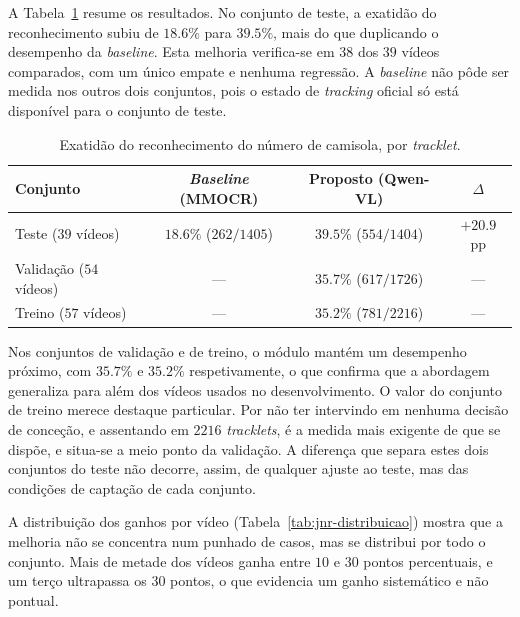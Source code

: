 A Tabela~\ref{tab:jnr-resumo} resume os resultados. No conjunto de teste, a exatidão do reconhecimento subiu de $18.6\%$ para $39.5\%$, mais do que duplicando o desempenho da \emph{baseline}. Esta melhoria verifica-se em $38$ dos $39$ vídeos comparados, com um único empate e nenhuma regressão. A \emph{baseline} não pôde ser medida nos outros dois conjuntos, pois o estado de \emph{tracking} oficial só está disponível para o conjunto de teste.

\begin{table}[htbp]
    \centering
    \caption{Exatidão do reconhecimento do número de camisola, por \emph{tracklet}.}
    \label{tab:jnr-resumo}
    \begin{tabular}{lccc}
        \hline
        \textbf{Conjunto} & \textbf{\emph{Baseline} (MMOCR)} & \textbf{Proposto (Qwen-VL)} & \textbf{$\Delta$} \\
        \hline
        Teste ($39$ vídeos)     & $18.6\%$ ($262/1405$) & $39.5\%$ ($554/1404$) & $+20.9$ pp \\
        Validação ($54$ vídeos) & ---                   & $35.7\%$ ($617/1726$) & --- \\
        Treino ($57$ vídeos)    & ---                   & $35.2\%$ ($781/2216$) & --- \\
        \hline
    \end{tabular}
\end{table}

Nos conjuntos de validação e de treino, o módulo mantém um desempenho próximo, com $35.7\%$ e $35.2\%$ respetivamente, o que confirma que a abordagem generaliza para além dos vídeos usados no desenvolvimento. O valor do conjunto de treino merece destaque particular. Por não ter intervindo em nenhuma decisão de conceção, e assentando em $2216$ \emph{tracklets}, é a medida mais exigente de que se dispõe, e situa-se a meio ponto da validação. A diferença que separa estes dois conjuntos do teste não decorre, assim, de qualquer ajuste ao teste, mas das condições de captação de cada conjunto.


A distribuição dos ganhos por vídeo (Tabela~\ref{tab:jnr-distribuicao}) mostra que a melhoria não se concentra num punhado de casos, mas se distribui por todo o conjunto. Mais de metade dos vídeos ganha entre $10$ e $30$ pontos percentuais, e um terço ultrapassa os $30$ pontos, o que evidencia um ganho sistemático e não pontual.

